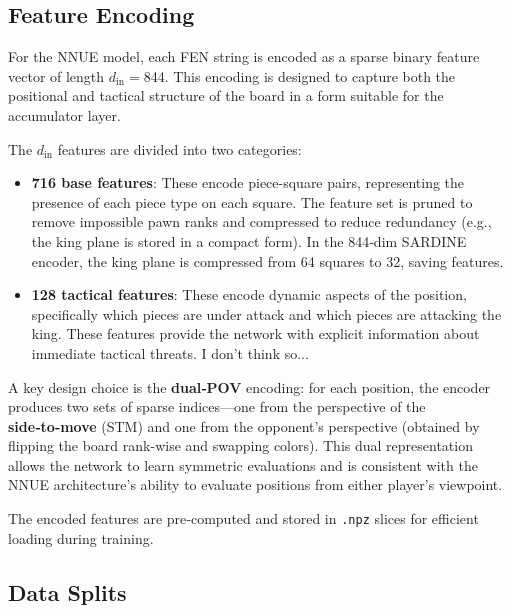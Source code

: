 \subsection{Feature Encoding}

For the NNUE model, each FEN string is encoded as a sparse binary feature vector of length $d_{\text{in}}=$844. This encoding is designed to capture both the positional and tactical structure of the board in a form suitable for the accumulator layer.

The $d_{\text{in}}$ features are divided into two categories:

\begin{itemize}
  \item \textbf{716 base features}: These encode piece-square pairs, representing the presence of each piece type on each square. The feature set is pruned to remove impossible pawn ranks and compressed to reduce redundancy (e.g., the king plane is stored in a compact form).  In the 844‑dim SARDINE encoder, the king plane is compressed from 64 squares to 32, saving features.
\end{itemize}


\begin{itemize}
  \item \textbf{128 tactical features}: These encode dynamic aspects of the position, specifically which pieces are under attack and which pieces are attacking the king. These features provide the network with explicit information about immediate tactical threats.  I don't think so...
\end{itemize}



A key design choice is the \textbf{dual‑POV} encoding: for each position, the encoder produces two sets of sparse indices---one from the perspective of the \textbf{side‑to‑move} (STM) and one from the opponent's perspective (obtained by flipping the board rank-wise and swapping colors). This dual representation allows the network to learn symmetric evaluations and is consistent with the NNUE architecture's ability to evaluate positions from either player's viewpoint.

The encoded features are pre‑computed and stored in \texttt{.npz} slices for efficient loading during training.

\subsection{Data Splits}

